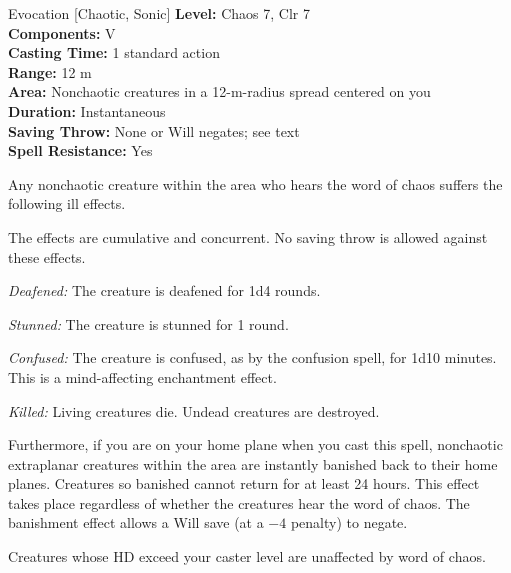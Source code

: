 {Evocation [Chaotic, Sonic]}
{
	\textbf{Level:}
	Chaos 7, Clr 7\\
	\textbf{Components:}
	V\\
	\textbf{Casting Time:}
	1 standard action\\
	\textbf{Range:}
	12 m\\
	\textbf{Area:}
	Nonchaotic creatures in a 12-m-radius spread centered on you\\
	\textbf{Duration:}
	Instantaneous\\
	\textbf{Saving Throw:}
	None or Will negates; see text\\
	\textbf{Spell Resistance:}
	Yes\\
}
{
	Any nonchaotic creature within the area who hears the word of chaos suffers the following ill effects.

	The effects are cumulative and concurrent. No saving throw is allowed against these effects.


	\textit{Deafened:}
	The creature is deafened for 1d4 rounds.

	\textit{Stunned:}
	The creature is stunned for 1 round.

	\textit{Confused:}
	The creature is confused, as by the confusion spell, for 1d10 minutes. This is a mind-affecting enchantment effect.

	\textit{Killed:}
	Living creatures die. Undead creatures are destroyed.

	Furthermore, if you are on your home plane when you cast this spell, nonchaotic extraplanar creatures within the area are instantly banished back to their home planes. Creatures so banished cannot return for at least 24 hours. This effect takes place regardless of whether the creatures hear the word of chaos. The banishment effect allows a Will save (at a $-4$ penalty) to negate.

	Creatures whose HD exceed your caster level are unaffected by word of chaos.

}
